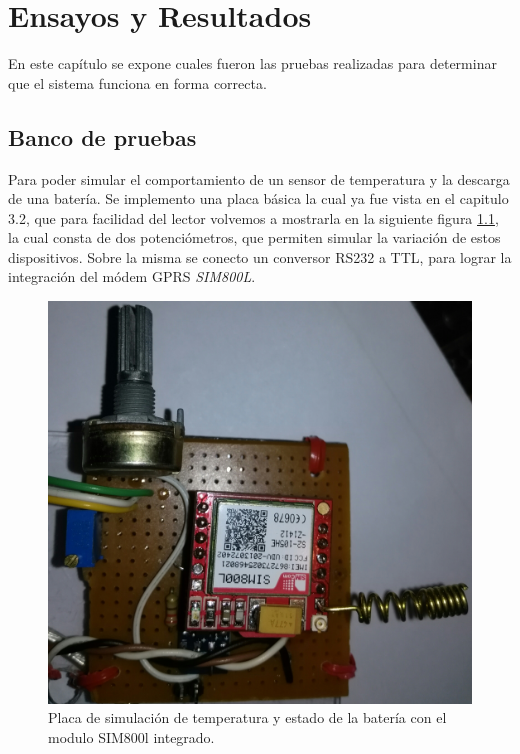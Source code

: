 \chapter{Ensayos y Resultados} %
En este capítulo se expone cuales fueron las pruebas realizadas para determinar que el sistema funciona en forma correcta.
\label{Chapter4} %

\section{Banco de pruebas}
Para poder simular el comportamiento de un sensor de temperatura y la descarga de una batería. Se implemento una placa básica la cual ya fue vista en el capitulo 3.2, que para facilidad del lector volvemos a mostrarla en la siguiente figura \ref{fig:placa_básica}, la cual consta de dos potenciómetros, que permiten simular la variación de estos dispositivos. Sobre la misma se conecto un conversor RS232 a TTL, para lograr la integración del módem GPRS \emph{SIM800L}.

\begin{figure}[h]
  \centering
  \includegraphics[scale=.03]{./Figures/placa_basica.jpg}
  \caption{Placa de simulación de temperatura y estado de la batería con el modulo SIM800l integrado.}
  \label{fig:placa_básica}
\end{figure}

